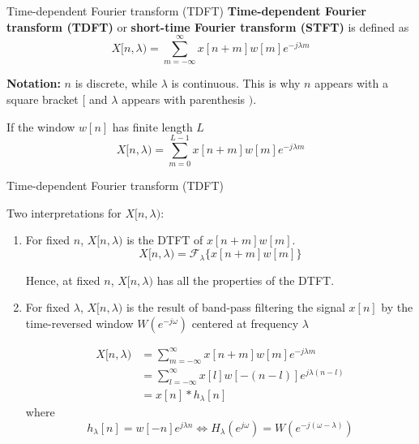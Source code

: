 \documentclass[10pt, aspectratio=169, handout]{beamer}
\begin{document}
%
\begin{frame}{Time-dependent Fourier transform (TDFT)}
\textbf{Time-dependent Fourier transform (TDFT)} or \textbf{short-time Fourier transform (STFT)} is defined as
\begin{equation*}
	X[n, \lambda) = \sum_{m = -\infty}^{\infty}x[n+m]w[m]e^{-j\lambda m}
\end{equation*}

\textbf{Notation:} $n$ is discrete, while $\lambda$ is continuous. This is why $n$ appears with a square bracket $[$ and $\lambda$ appears with parenthesis $)$.
\vspace{0.25cm}

If the window $w[n]$ has finite length $L$
\begin{equation*}
X[n, \lambda) = \sum_{m = 0}^{L-1}x[n+m]w[m]e^{-j\lambda m}
\end{equation*}

\end{frame}

%
\begin{frame}{Time-dependent Fourier transform (TDFT)}

Two interpretations for $X[n, \lambda)$:

\begin{enumerate}
	\item For fixed $n$, $X[n, \lambda)$ is the DTFT of $x[n+m]w[m]$. 
	\begin{equation}
		X[n, \lambda) = \mathcal{F}_\lambda\{x[n+m]w[m]\} \tag{fixed $n$}
	\end{equation}
	
	Hence, at fixed $n$, $X[n, \lambda)$ has all the properties of the DTFT.
	\vspace{0.25cm}
	\item For fixed $\lambda$, $X[n, \lambda)$ is the result of band-pass filtering the signal $x[n]$ by the time-reversed window $W(e^{-j\omega})$ centered at frequency $\lambda$
	
	\begin{align*}
		X[n, \lambda) &= \sum_{m = -\infty}^{\infty}x[n+m]w[m]e^{-j\lambda m} \tag{definition} \\
		&= \sum_{l = -\infty}^{\infty}x[l]w[-(n-l)]e^{j\lambda(n-l)} \tag{change of variables $l = n+m$} \\
		&=x[n]\ast h_\lambda[n] \tag{fixed $\lambda$}
	\end{align*}
	where 
	\begin{equation*}
		h_\lambda[n] = w[-n]e^{j\lambda n} \Longleftrightarrow H_\lambda(e^{j\omega}) = W(e^{-j(\omega-\lambda)}) 
	\end{equation*}
	
\end{enumerate}
\end{frame}
\end{document}
